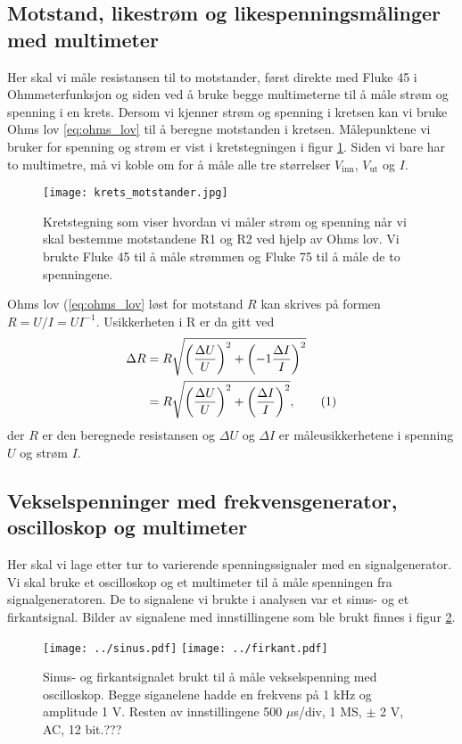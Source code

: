 \documentclass[reprint, english,notitlepage]{revtex4-1}  %
\newcommand\numberthis{\addtocounter{equation}{1}\tag{\theequation}}
\begin{document}
\subsection{Motstand, likestrøm og likespenningsmålinger med multimeter}
Her skal vi måle resistansen til to motstander, først direkte med Fluke 45 i Ohmmeterfunksjon og siden ved å bruke begge multimeterne til å måle strøm og spenning i en krets. Dersom vi kjenner strøm og spenning i kretsen kan vi bruke Ohms lov \ref{eq:ohms_lov} til å beregne motstanden i kretsen. Målepunktene vi bruker for spenning og strøm er vist i kretstegningen i figur \ref{fig:krets_motstander}. Siden vi bare har to multimetre, må vi koble om for å måle alle tre størrelser $V_{\text{inn}}$, $V_{\text{ut}}$ og $I$.
\begin{figure}
  \texttt{[image: krets\_motstander.jpg]}
  \caption{Kretstegning som viser hvordan vi måler strøm og spenning når vi skal bestemme motstandene R1 og R2 ved hjelp av Ohms lov. Vi brukte Fluke 45 til å måle strømmen og Fluke 75 til å måle de to spenningene.}
  \label{fig:krets_motstander}
\end{figure}

Ohms lov (\ref{eq:ohms_lov} løst for motstand $R$ kan skrives på formen $R = U/I = U I^{-1}$. Usikkerheten i R er da gitt ved
\begin{align*}
  \Delta R &= R \sqrt{\left( \frac{\Delta U}{U} \right) ^2 + \left( -1 \frac{\Delta I}{I} \right) ^2} \\
  &= R \sqrt{\left( \frac{\Delta U}{U} \right) ^2 + \left( \frac{\Delta I}{I} \right) ^2}, \numberthis \label{eq:usikkerhet_R}
\end{align*}
der $R$ er den beregnede resistansen og $\Delta U$ og $\Delta I$ er måleusikkerhetene i spenning $U$ og strøm $I$.


\subsection{Vekselspenninger med frekvensgenerator, oscilloskop og multimeter}
Her skal vi lage etter tur to varierende spenningssignaler med en signalgenerator. Vi skal bruke et oscilloskop og et multimeter til å måle spenningen fra signalgeneratoren. De to signalene vi brukte i analysen var et sinus- og et firkantsignal. Bilder av signalene med innstillingene som ble brukt finnes i figur \ref{fig:inputsignaler}.

\begin{figure}
  \texttt{[image: ../sinus.pdf]}
  \texttt{[image: ../firkant.pdf]}
  \caption{Sinus- og firkantsignalet brukt til å måle vekselspenning med oscilloskop. Begge siganelene hadde en frekvens på 1 kHz og amplitude 1 V. Resten av innstillingene 500 $\mu$s/div, 1 MS, $\pm$ 2 V, AC, 12 bit.???}
  \label{fig:inputsignaler}
\end{figure}
\end{document}
